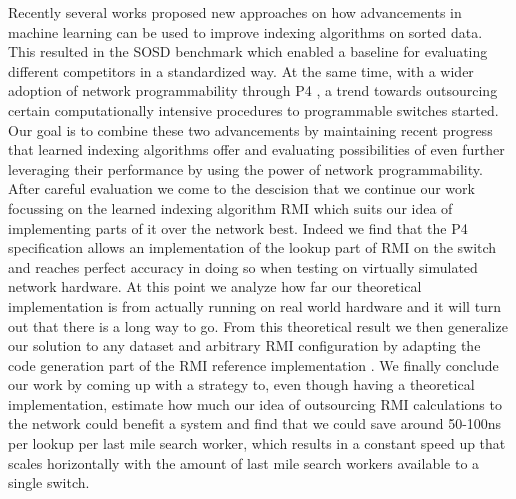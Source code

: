 Recently several works proposed new approaches on how advancements in machine learning can be used to improve indexing algorithms on sorted data. This resulted in the SOSD benchmark \cite{sosd-vldb} which enabled a baseline for evaluating different competitors in a standardized way. At the same time, with a wider adoption of network programmability through P4 \cite{p4-spec}, a trend towards outsourcing certain computationally intensive procedures to programmable switches started. Our goal is to combine these two advancements by maintaining recent progress that learned indexing algorithms offer and evaluating possibilities of even further leveraging their performance by using the power of network programmability.\\

After careful evaluation we come to the descision that we continue our work focussing on the learned indexing algorithm RMI \cite{rmi} which suits our idea of implementing parts of it over the network best. Indeed we find that the P4 specification \cite{p4-spec} allows an implementation of the lookup part of RMI on the switch and reaches perfect accuracy in doing so when testing on virtually simulated network hardware. At this point we analyze how far our theoretical implementation is from actually running on real world hardware and it will turn out that there is a long way to go. From this theoretical result we then generalize our solution to any dataset and arbitrary RMI configuration by adapting the code generation part of the RMI reference implementation \cite{cdfshop}. We finally conclude our work by coming up with a strategy to, even though having a theoretical implementation, estimate how much our idea of outsourcing RMI calculations to the network could benefit a system and find that we could save around 50-100ns per lookup per last mile search worker, which results in a constant speed up that scales horizontally with the amount of last mile search workers available to a single switch.
